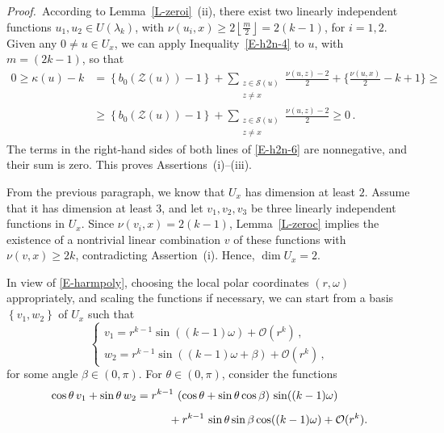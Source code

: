 \documentclass[12pt,a4paper]{amsart}
\theoremstyle{plain} %
\theoremstyle{definition}
\numberwithin{equation}{section}
\numberwithin{figure}{section}
\numberwithin{table}{section}
\newcommand{\cO}{\mathcal{O}}
\newcommand{\cS}{\mathcal{S}}
\newcommand{\cZ}{\mathcal{Z}}
\newcommand{\pf}{\emph{Proof.~}}
\newcommand{\set}[1]{\left\lbrace #1 \right\rbrace}
\newcommand{\floor}[1]{\left\lfloor #1 \right\rfloor}
\begin{document}
\pf  According to Lemma~\ref{L-zeroi}~(ii), there exist two linearly independent functions $u_{1}, u_{2} \in U(\lambda_k)$, with $\nu(u_{i},x) \ge 2\floor{\frac m2} = 2(k-1)$, for $i = 1, 2$.  Given any $0 \not = u \in U_x$, we can apply Inequality~\eqref{E-h2n-4} to $u$, with $m = (2k-1)$, so that
%
\begin{equation}\label{E-h2n-6}
\begin{split}
0 \ge \kappa(u) - k &= \left\lbrace b_0(\cZ(u)) - 1\right\rbrace + \sum_{\substack{z \in \cS(u)\\ z \not = x}} \frac{\nu(u,z) - 2}{2} + \lbrace \frac{\nu(u,x)}{2} - k + 1 \rbrace \ge\\[5pt]
&\ge \left\lbrace b_0(\cZ(u)) - 1\right\rbrace + \sum_{\substack{z \in \cS(u)\\ z \not = x}} \frac{\nu(u,z) - 2}{2} \ge 0\,.
\end{split}%
\end{equation}
%
The terms in the right-hand sides of both lines of \eqref{E-h2n-6} are nonnegative, and their sum is zero. This proves Assertions~(i)--(iii).\smallskip

From the previous paragraph, we know that $U_x$ has dimension at least $2$. Assume that it has dimension at least $3$, and let $v_1, v_2, v_3$ be three linearly independent functions in $U_x$. Since $\nu(v_i,x) = 2(k-1)$,  Lemma~\ref{L-zeroc} implies the existence of a nontrivial linear combination $v$ of these functions with $\nu(v,x) \ge 2k$, contradicting Assertion~(i). Hence, $\dim U_x = 2$.\smallskip

In view of \eqref{E-harmpoly}, choosing the local polar coordinates $(r,\omega)$ appropriately, and scaling the functions if necessary, we can start from a basis $\set{v_1,w_2}$ of $U_x$ such that
%
\begin{equation*}
\left\{
\begin{array}{l}
v_1 = r^{k-1} \sin ((k-1)\omega) +\mathcal O (r^k)\,,\\
w_2 = r^{k-1} \sin ((k-1)\omega + \beta) +\mathcal O (r^k)\,,
\end{array}
\right.
\end{equation*}
for some angle $\beta \in (0,\pi)$. For $\theta \in (0,\pi)$, consider the functions
%
\begin{equation*}
\begin{split}
\cos\theta \, v_1 + \sin\theta \, w_2 & = r^{k-1} \, \left( \cos\theta  + \sin\theta \cos\beta \right)\, \sin((k-1)\omega) \\[5pt]
& \hspace{10mm}+ r^{k-1}\, \sin\theta\sin\beta\cos((k-1)\omega) + \cO(r^k).
\end{split}%
\end{equation*}
\end{document}
